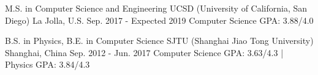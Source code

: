 


\begin{cventries}


\cventry
{M.S. in Computer Science and Engineering} %
{UCSD (University of California, San Diego)} %
{La Jolla, U.S.} %
{Sep. 2017 - Expected 2019} %
{Computer Science GPA: 3.88/4.0}


\cventry
{B.S. in Physics, B.E. in Computer Science} %
{SJTU (Shanghai Jiao Tong University)} %
{Shanghai, China} %
{Sep. 2012 - Jun. 2017} %
{Computer Science GPA: 3.63/4.3 \hspace{.1cm} | \hspace{.1cm} Physics GPA: 3.84/4.3}


\end{cventries}
